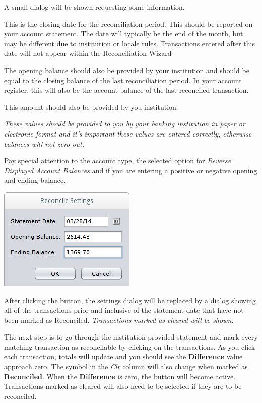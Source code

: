 \documentclass[letterpaper,12pt]{book}
\begin{document}
    A small dialog will be shown requesting some information.

    \begin{description}[style=nextline]
        \item[Statement Date]
        This is the closing date for the reconciliation period.
        This should be reported on your account statement.
        The date will typically be the end of the month, but may be different due to institution or locale rules.
        Transactions entered after this date will not appear within the Reconciliation Wizard
        \item[Opening Balance]
        The opening balance should also be provided by your institution and should be equal to the closing balance
        of the last reconciliation period.
        In your account register, this will also be the account balance of the last reconciled transaction.
        \item[Ending Balance]
        This amount should also be provided by you institution.
    \end{description}

    \textit{These values should be provided to you by your banking institution in paper or electronic format and
    it's important these values are entered correctly, otherwise balances will not zero out.}

    Pay special attention to the account type, the selected option for \textit{Reverse Displayed Account Balances}
    and if you are entering a positive or negative opening and ending balance.

    \includegraphics[width=0.4\linewidth]{images/reconcile-settings}

    After clicking the  button, the settings dialog will be replaced by a
    dialog showing all of the transactions prior and inclusive of the statement date
    that have not been marked as Reconciled. \textit{Transactions marked as cleared will be shown.}

    The next step is to go through the institution provided statement and mark every
    matching transaction as reconcilable by clicking on the transactions. As you
    click each transaction, totals will update and you should see the
    \textbf{Difference} value approach zero. The symbol in the \textit{Clr} column will
    also change when marked as \textbf{Reconciled}. When the \textbf{Difference} is zero,
    the  button will become active. Transactions marked as cleared will
    also need to be selected if they are to be reconciled.
\end{document}
